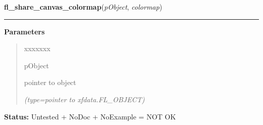 \hspace{.8\funcindent}\begin{boxedminipage}{\funcwidth}

    \raggedright \textbf{fl\_share\_canvas\_colormap}(\textit{pObject}, \textit{colormap})

    \vspace{-1.5ex}

    \rule{\textwidth}{0.5\fboxrule}
\setlength{\parskip}{2ex}
\setlength{\parskip}{1ex}
      \textbf{Parameters}
      \vspace{-1ex}

      \begin{quote}
        \begin{Ventry}{xxxxxxx}

          \item[pObject]

          pointer to object

            {\it (type=pointer to xfdata.FL\_OBJECT)}

        \end{Ventry}

      \end{quote}

\textbf{Status:} Untested + NoDoc + NoExample = NOT OK



    \end{boxedminipage}

    \label{xformslib:library:fl_clear_canvas}

    \vspace{0.5ex}

